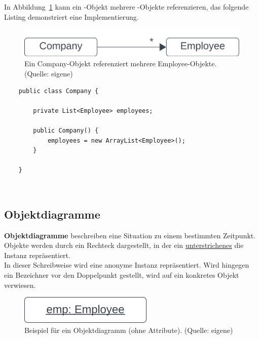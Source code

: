 \noindent
In Abbildung~\ref{fig:multipleemployees} kann ein -Objekt mehrere -Objekte referenzieren, das folgende Listing demonstriert eine Implementierung.\\

\begin{figure}
    \centering
    \includegraphics[scale=0.5]{chapters/fopt3/img/multipleemployees}
    \caption{Ein Company-Objekt referenziert mehrere Employee-Objekte. (Quelle: eigene)}
    \label{fig:multipleemployees}
\end{figure}


\begin{verbatim}
    public class Company {

        private List<Employee> employees;

        public Company() {
            employees = new ArrayList<Employee>();
        }

    }
\end{verbatim}\\

\subsection{Objektdiagramme}

\textbf{Objektdiagramme} beschreiben eine Situation zu einem bestimmten Zeitpunkt.\\

\noindent
Objekte werden durch ein Rechteck dargestellt, in der ein \ul{unterstrichenes} \code{:[Klassenname]} die Instanz repräsentiert. \\
In dieser Schreibweise wird eine anonyme Instanz repräsentiert.
Wird hingegen ein Bezeichner vor den Doppelpunkt gestellt, wird auf ein konkretes Objekt verwiesen.\\

\begin{figure}
    \centering
    \includegraphics[scale=0.5]{chapters/fopt3/img/objectdiagram}
    \caption{Beispiel für ein Objektdiagramm (ohne Attribute). (Quelle: eigene)}
    \label{fig:objectdiagram}
\end{figure}

